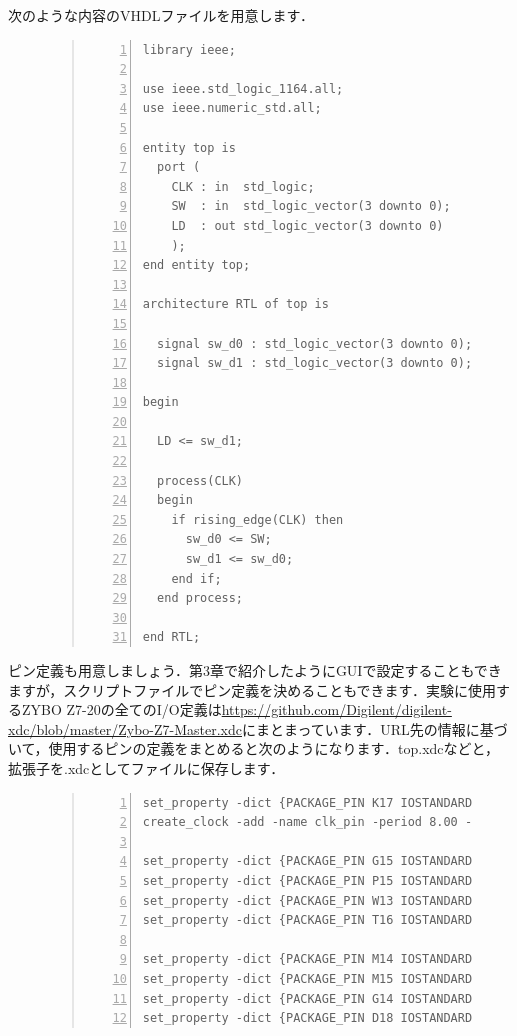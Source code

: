 \documentclass[a4paper,dvipdfmx]{jsarticle}
\begin{document}
次のような内容のVHDLファイルを用意します．

\begin{figure}[H]
\begin{quote}
\begin{Verbatim}[frame=single, numbers=left, baselinestretch=0.8]
library ieee;

use ieee.std_logic_1164.all;
use ieee.numeric_std.all;

entity top is
  port (
    CLK : in  std_logic;
    SW  : in  std_logic_vector(3 downto 0);
    LD  : out std_logic_vector(3 downto 0)
    );
end entity top;

architecture RTL of top is

  signal sw_d0 : std_logic_vector(3 downto 0);
  signal sw_d1 : std_logic_vector(3 downto 0);
  
begin

  LD <= sw_d1;
  
  process(CLK)
  begin
    if rising_edge(CLK) then
      sw_d0 <= SW;
      sw_d1 <= sw_d0;
    end if;
  end process;
  
end RTL;
\end{Verbatim}
\end{quote}
\end{figure}

ピン定義も用意しましょう．第3章で紹介したようにGUIで設定することもできますが，スクリプトファイルでピン定義を決めることもできます．実験に使用するZYBO Z7-20の全てのI/O定義は\url{https://github.com/Digilent/digilent-xdc/blob/master/Zybo-Z7-Master.xdc}にまとまっています．URL先の情報に基づいて，使用するピンの定義をまとめると次のようになります．top.xdcなどと，拡張子を.xdcとしてファイルに保存します．
\begin{figure}[H]
\begin{quote}
\begin{Verbatim}[frame=single, numbers=left, baselinestretch=0.8]
set_property -dict {PACKAGE_PIN K17 IOSTANDARD LVCMOS33 } [get_ports {CLK}];
create_clock -add -name clk_pin -period 8.00 -waveform {0 4} [get_ports {CLK}];

set_property -dict {PACKAGE_PIN G15 IOSTANDARD LVCMOS33} [get_ports {SW[0]}];
set_property -dict {PACKAGE_PIN P15 IOSTANDARD LVCMOS33} [get_ports {SW[1]}];
set_property -dict {PACKAGE_PIN W13 IOSTANDARD LVCMOS33} [get_ports {SW[2]}];
set_property -dict {PACKAGE_PIN T16 IOSTANDARD LVCMOS33} [get_ports {SW[3]}];

set_property -dict {PACKAGE_PIN M14 IOSTANDARD LVCMOS33} [get_ports {LD[0]}];
set_property -dict {PACKAGE_PIN M15 IOSTANDARD LVCMOS33} [get_ports {LD[1]}];
set_property -dict {PACKAGE_PIN G14 IOSTANDARD LVCMOS33} [get_ports {LD[2]}];
set_property -dict {PACKAGE_PIN D18 IOSTANDARD LVCMOS33} [get_ports {LD[3]}];
\end{Verbatim}
\end{quote}
\end{figure}
\end{document}
